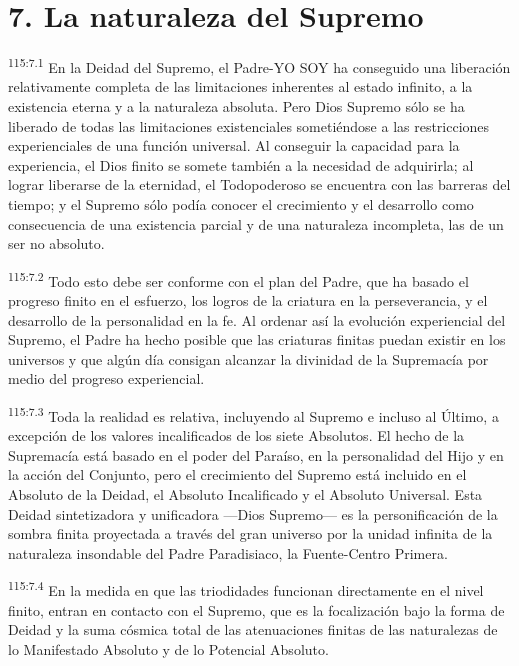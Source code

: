 \documentclass[twoside, 11pt]{book}
\begin{document}
\section*{7. La naturaleza del Supremo}
\par
\textsuperscript{115:7.1} En la Deidad del Supremo, el Padre-YO SOY ha conseguido una liberación relativamente completa de las limitaciones inherentes al estado infinito, a la existencia eterna y a la naturaleza absoluta. Pero Dios Supremo sólo se ha liberado de todas las limitaciones existenciales sometiéndose a las restricciones experienciales de una función universal. Al conseguir la capacidad para la experiencia, el Dios finito se somete también a la necesidad de adquirirla; al lograr liberarse de la eternidad, el Todopoderoso se encuentra con las barreras del tiempo; y el Supremo sólo podía conocer el crecimiento y el desarrollo como consecuencia de una existencia parcial y de una naturaleza incompleta, las de un ser no absoluto.

\par
\textsuperscript{115:7.2} Todo esto debe ser conforme con el plan del Padre, que ha basado el progreso finito en el esfuerzo, los logros de la criatura en la perseverancia, y el desarrollo de la personalidad en la fe. Al ordenar así la evolución experiencial del Supremo, el Padre ha hecho posible que las criaturas finitas puedan existir en los universos y que algún día consigan alcanzar la divinidad de la Supremacía por medio del progreso experiencial.

\par
\textsuperscript{115:7.3} Toda la realidad es relativa, incluyendo al Supremo e incluso al Último, a excepción de los valores incalificados de los siete Absolutos. El hecho de la Supremacía está basado en el poder del Paraíso, en la personalidad del Hijo y en la acción del Conjunto, pero el crecimiento del Supremo está incluido en el Absoluto de la Deidad, el Absoluto Incalificado y el Absoluto Universal. Esta Deidad sintetizadora y unificadora ---Dios Supremo--- es la personificación de la sombra finita proyectada a través del gran universo por la unidad infinita de la naturaleza insondable del Padre Paradisiaco, la Fuente-Centro Primera.

\par
\textsuperscript{115:7.4} En la medida en que las triodidades funcionan directamente en el nivel finito, entran en contacto con el Supremo, que es la focalización bajo la forma de Deidad y la suma cósmica total de las atenuaciones finitas de las naturalezas de lo Manifestado Absoluto y de lo Potencial Absoluto.
\end{document}

